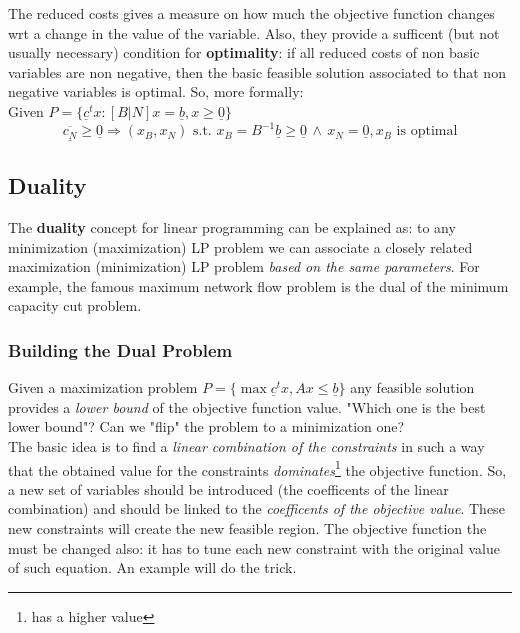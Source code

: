 \documentclass{article}
\begin{document}
					The reduced costs gives a measure on how much the objective function changes wrt a change in the value of the variable. Also, they provide a sufficent (but not usually necessary) condition for \textbf{optimality}: if all reduced costs of non basic variables are non negative, then the basic feasible solution associated to that non negative variables is optimal. So, more formally:\\
					Given $P = \{\underline{c}^tx : [B \vert N]x = \underline{b}, x \geq \underline{0}\}$
					\begin{equation}
						\underline{\overline{c_N}} \geq \underline{0} \Rightarrow (x_B, x_N) \text{ s.t. } x_B = B^{-1}\underline{b} \geq \underline{0} \,\wedge\, x_N = \underline{0}, x_B \text{ is optimal}
					\end{equation}

		\subsection{Duality}
			The \textbf{duality} concept for linear programming can be explained as: to any minimization (maximization) LP problem we can associate a closely related maximization (minimization) LP problem \textit{based on the same parameters}. For example, the famous maximum network flow problem is the dual of the minimum capacity cut problem.

			\subsubsection{Building the Dual Problem}
				Given a maximization problem $P = \{\max \underline{c}^tx, Ax \leq \underline{b}\}$ any feasible solution provides a \textit{lower bound} of the objective function value. "Which one is the best lower bound"? Can we "flip" the problem to a minimization one?\\
				The basic idea is to find a \textit{linear combination of the constraints} in such a way that the obtained value for the constraints \textit{dominates}\footnote{has a higher value} the objective function. So, a new set of variables should be introduced (the coefficents of the linear combination) and should be linked to the \textit{coefficents of the objective value}. These new constraints will create the new feasible region. The objective function the must be changed also: it has to tune each new constraint with the original value of such equation. An example will do the trick.
\end{document}
